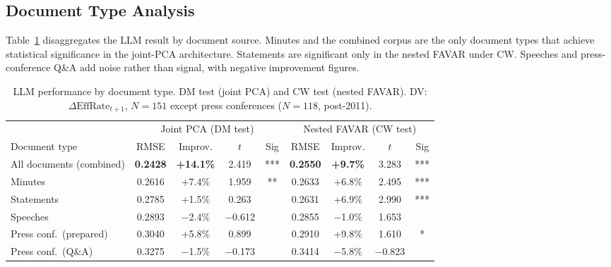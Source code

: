 
\subsection{Document Type Analysis}

Table~\ref{tab:doctype} disaggregates the LLM result by document source. Minutes and the combined corpus are the only document types that achieve statistical significance in the joint-PCA architecture. Statements are significant only in the nested FAVAR under CW. Speeches and press-conference Q\&A add noise rather than signal, with negative improvement figures.

\begin{table}[ht]
\centering
\caption{LLM performance by document type. DM test (joint PCA) and CW test (nested FAVAR). DV: $\Delta\text{EffRate}_{t+1}$, $N = 151$ except press conferences ($N = 118$, post-2011).}
\label{tab:doctype}
\small
\begin{tabular}{lcccc|cccc}
\toprule
& \multicolumn{4}{c|}{Joint PCA (DM test)} & \multicolumn{4}{c}{Nested FAVAR (CW test)} \\
Document type & RMSE & Improv. & $t$ & Sig & RMSE & Improv. & $t$ & Sig \\
\midrule
All documents (combined) & \textbf{0.2428} & \textbf{+14.1\%} & 2.419 & *** & \textbf{0.2550} & \textbf{+9.7\%}  & 3.283 & *** \\
Minutes                  & 0.2616          & +7.4\%           & 1.959 & **  & 0.2633          & +6.8\%           & 2.495 & *** \\
Statements               & 0.2785          & +1.5\%           & 0.263 &     & 0.2631          & +6.9\%           & 2.990 & *** \\
Speeches                 & 0.2893          & $-$2.4\%         & $-$0.612 &  & 0.2855          & $-$1.0\%         & 1.653 &     \\
Press conf.\ (prepared)  & 0.3040          & +5.8\%           & 0.899 &     & 0.2910          & +9.8\%           & 1.610 & *   \\
Press conf.\ (Q\&A)      & 0.3275          & $-$1.5\%         & $-$0.173 &  & 0.3414          & $-$5.8\%         & $-$0.823 &  \\
\bottomrule
\end{tabular}
\end{table}

